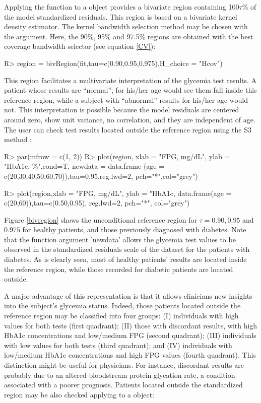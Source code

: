 Applying the function  to a  object provides a bivariate region containing 100$\tau$\% of the model standardized residuals. This region is based on a bivariate kernel density estimator. The kernel bandwidth selection method may be chosen with the  argument. Here, the 90\%, 95\% and 97.5\% regions are obtained with the best coverage bandwidth selector (see equation \eqref{CV}):


\begin{example}
R> region = bivRegion(fit,tau=c(0.90,0.95,0.975),H_choice = "Hcov")
\end{example}

This region facilitates a multivariate interpretation of the glycemia test results. A patient whose results are ``normal'', for his/her age would see them fall inside this reference region, while a subject with ``abnormal'' results for his/her age would not. This interpretation is possible because the model residuals are centered around zero, show unit variance, no correlation, and they are independent of age. The user can check test results located outside the reference region using the  S3 method :


\begin{example}
R> par(mfrow = c(1, 2))
R> plot(region, xlab = "FPG, mg/dL", ylab = "HbA1c, \%",cond=T, newdata = 
 data.frame (age = c(20,30,40,50,60,70)),tau=0.95,reg.lwd=2, pch="*",col="grey")

R> plot(region,xlab = "FPG, mg/dL", ylab = "HbA1c, %
   data.frame(age = c(20,60)),tau=c(0.50,0.95), reg.lwd=2, pch="*", col="grey")
\end{example}

Figure \ref{bivregion} shows the unconditional reference region for $\tau = 0.90, 0.95$ and $0.975$ for healthy patients, and those previously diagnosed with diabetes. Note that the  function argument 'newdata' allows the glycemia test values to be observed in the standardized residuals scale of the dataset for the patients with diabetes. As is clearly seen, most of healthy patients' results are located inside the reference region, while those recorded for diabetic patients are located outside.




A major advantage of this representation is that it allows clinicians new insights into the subject’s glycemia status. Indeed, those patients located outside the reference region may be classified into four groups: (I) individuals with high values for both tests (first quadrant); (II) those with discordant results, with high HbA1c concentrations and low/medium FPG (second quadrant); (III) individuals with low values for both tests (third quadrant); and (IV) individuals with low/medium HbA1c concentrations and high FPG values (fourth quadrant). This distinction might be useful for physicians. For instance, discordant results are probably due to an altered bloodstream protein glycation rate, a condition associated with a poorer prognosis. Patients located outside the standardized region may be also checked applying  to a  object:


